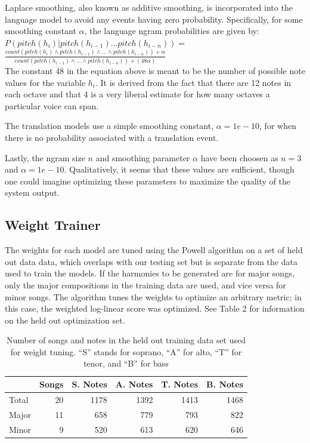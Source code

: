 \documentclass{sig-alternate}
\begin{document}
Laplace smoothing, also known as additive smoothing, is incorporated into the language model to avoid any events having zero probability. Specifically, for some smoothing constant $\alpha$, the language ngram probabilities are given by: \\

$P(pitch(h_{i}) | pitch(h_{i - 1}) ... pitch(h_{i - n})) = $\\

$\frac{count(pitch(h_{i}) \wedge pitch(h_{i - 1}) \wedge ... \wedge pitch(h_{i - n})) + \alpha}{count(pitch(h_{i - 1}) \wedge ... \wedge pitch(h_{i - n})) + (48\alpha)}$\\

The constant $48$ in the equation above is meant to be the number of possible note values for the variable $h_{i}$. It is derived from the fact that there are 12 notes in each octave and that 4 is a very liberal estimate for how many octaves a particular voice can span. 

The translation models use a simple smoothing constant, $\alpha = 1e-10$, for when there is no probability associated with a translation event.

Lastly, the ngram size $n$ and smoothing parameter $\alpha$ have been choosen as $n = 3$ and $\alpha = 1e-10$. Qualitatively, it seems that these values are sufficient, though one could imagine optimizing these parameters to maximize the quality of the system output.

\subsection{Weight Trainer}
The weights for each model are tuned using the Powell algorithm \cite{Koehn:2010:SMT:1734086} on a set of held out data data, which overlaps with our testing set but is separate from the data used to train the models. If the harmonies to be generated are for major songs, only the major compositions in the training data are used, and vice versa for minor songs. The algorithm tunes the weights to optimize an arbitrary metric; in this case, the weighted log-linear score was optimized. See Table 2 for information on the held out optimization set. 

\begin{table}[h]
  \begin{center}
      \begin{tabular}{| l | r | r | r | r | r |}
      \hline
       \  & Songs & S. Notes & A. Notes & T. Notes & B. Notes \\ \hline
       Total &  20 & 1178 & 1392 & 1413 & 1468 \\ 
       Major &  11 & 658 & 779 & 793 & 822 \\ 
       Minor & 9 & 520 & 613 & 620 & 646  \\ \hline
      \end{tabular}
  \end{center}
  \caption{Number of songs and notes in the held out training data set used for weight tuning. ``S'' stands for soprano, ``A'' for alto, ``T'' for tenor, and ``B'' for bass}
\end{table}
\end{document}
